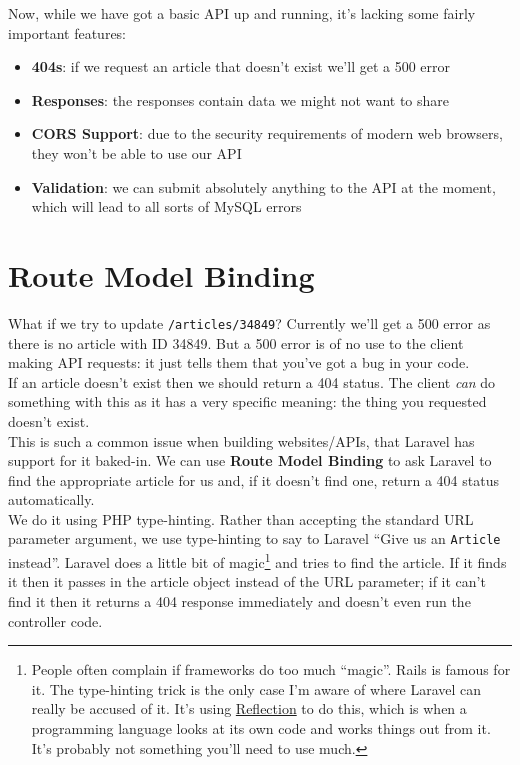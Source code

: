 Now, while we have got a basic API up and running, it's lacking some fairly important features:

\begin{itemize}
    \item \textbf{404s}: if we request an article that doesn't exist we'll get a 500 error
    \item \textbf{Responses}: the responses contain data we might not want to share
    \item \textbf{CORS Support}: due to the security requirements of modern web browsers, they won't be able to use our API
    \item \textbf{Validation}: we can submit absolutely anything to the API at the moment, which will lead to all sorts of MySQL errors
\end{itemize}



\section{Route Model Binding}

What if we try to update \texttt{/articles/34849}? Currently we'll get a 500 error as there is no article with ID 34849. But a 500 error is of no use to the client making API requests: it just tells them that you've got a bug in your code.
\\

If an article doesn't exist then we should return a 404 status. The client \textit{can} do something with this as it has a very specific meaning: the thing you requested doesn't exist.
\\

This is such a common issue when building websites/APIs, that Laravel has support for it baked-in. We can use \textbf{Route Model Binding} to ask Laravel to find the appropriate article for us and, if it doesn't find one, return a 404 status automatically.
\\

We do it using PHP type-hinting. Rather than accepting the standard URL parameter argument, we use type-hinting to say to Laravel ``Give us an \texttt{Article} instead''. Laravel does a little bit of magic\footnote{People often complain if frameworks do too much ``magic''. Rails is famous for it. The type-hinting trick is the only case I'm aware of where Laravel can really be accused of it. It's using \href{https://www.culttt.com/2014/07/02/reflection-php}{Reflection} to do this, which is when a programming language looks at its own code and works things out from it. It's probably not something you'll need to use much.} and tries to find the article. If it finds it then it passes in the article object instead of the URL parameter; if it can't find it then it returns a 404 response immediately and doesn't even run the controller code.
\\

